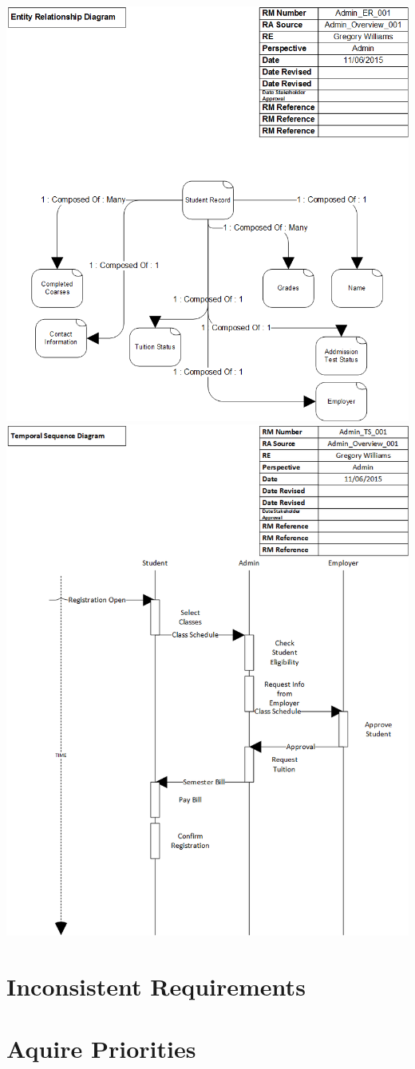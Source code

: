 \documentclass{article}
\begin{document}
	\\
	\includegraphics[width=\textwidth]{EntityRelationship}
	\\	
	\includegraphics[width=\textwidth]{TemporalSequence}
	\\
	\section*{Inconsistent Requirements}
	\section*{Aquire Priorities}
\end{document}
